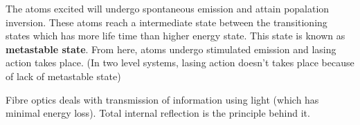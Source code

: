 \documentclass[12pt, a4paper]{article}
\begin{document}









The atoms excited will undergo spontaneous emission and attain popalation inversion. These atoms reach a intermediate state between the transitioning states which has more life time than higher energy state. This state is known as \textbf{metastable state}. From here, atoms undergo stimulated emission and lasing action takes place. (In two level systems, lasing action doesn't takes place because of lack of metastable state)





\vspace{1.5cm}











\vspace{1.5cm}



\newpage

Fibre optics deals with transmission of information using light (which has minimal energy loss). Total internal reflection is the principle behind it.







\vspace{1.5cm}


\vspace{1.5cm}

\end{document}
